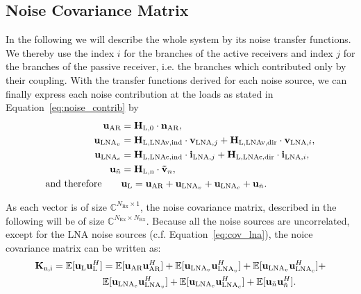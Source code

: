 \subsection{Noise Covariance Matrix}
\label{sec:sig_cov}
In the following we will describe the whole system by its noise transfer functions.
We thereby use the index $i$ for the branches of the active receivers and index $j$ for the branches of the passive receiver, i.e. the branches which contributed only by their coupling.
With the transfer functions derived for each noise source, we can finally express each noise contribution at the loads as stated in Equation~\eqref{eq:noise_contrib} by
\begin{align}
\label{eq:noise_output}
\nonumber
\mathbf{u}_\text{AR} &= \mathbf{H}_\text{L,0}\cdot\mathbf{n}_\text{AR},\\\nonumber 
\mathbf{u}_{\text{LNA}_v} &= 
	\mathbf{H}_\text{L,LNAv,ind}\cdot\mathbf{v}_{\text{LNA},j}+
	\mathbf{H}_\text{L,LNAv,dir}\cdot\mathbf{v}_{\text{LNA},i},\\\nonumber
\mathbf{u}_{\text{LNA}_c} &= 
	\mathbf{H}_\text{L,LNAc,ind}\cdot\mathbf{i}_{\text{LNA},j}+
	\mathbf{H}_\text{L,LNAc,dir}\cdot\mathbf{i}_{\text{LNA},i},\\\nonumber
\mathbf{u}_{\tilde{n}} &= \mathbf{H}_\text{L,n}\cdot\mathbf{\tilde{v}}_{n},\\
\text{and therefore}\qquad &\mathbf{u}_\text{L} = \mathbf{u}_\text{AR} + \mathbf{u}_{\text{LNA}_v} + \mathbf{u}_{\text{LNA}_c} + \mathbf{u}_{\tilde{n}}.
\end{align}

As each vector is of size $\mathbb{C}^{ N_\text{Rx}\times 1}$, the noise covariance matrix, described in the following will be of size $\mathbb{C}^{ N_\text{Rx}\times N_\text{Rx}}$.
Because all the noise sources are uncorrelated, except for the LNA noise sources (c.f. Equation~\eqref{eq:cov_lna}), the noice covariance matrix can be written as:
\begin{align}
\label{eq:exp_noise}\nonumber
\mat{K}_\text{n,i} =\mathbb{E}[\vec{u}_\text{L}\vec{u}_\text{L}^H] &=
\mathbb{E}[\vec{u}_\text{AR}\vec{u}_\text{AR}^H]+ 
\mathbb{E}[\vec{u}_{\text{LNA}_v}\vec{u}_{\text{LNA}_v}^H] +
\mathbb{E}[\vec{u}_{\text{LNA}_v}\vec{u}_{\text{LNA}_c}^H] +\\%
\quad&\mathbb{E}[\vec{u}_{\text{LNA}_c}\vec{u}_{\text{LNA}_v}^H] +
\mathbb{E}[\vec{u}_{\text{LNA}_c}\vec{u}_{\text{LNA}_c}^H] +
\mathbb{E}[\vec{u}_{\tilde{n}}\vec{u}_{\tilde{n}}^H].
\end{align}

